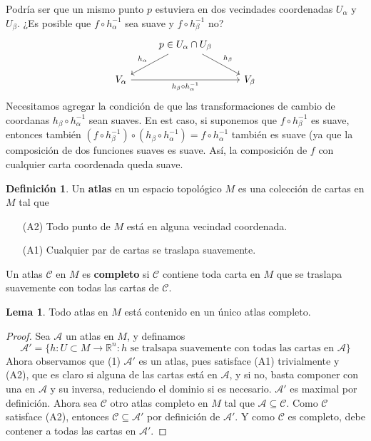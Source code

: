 \documentclass[spanish]{book}
\theoremstyle{definition}
\newtheorem*{defn}{Definición}
\newtheorem*{lema}{Lema}
\newcommand{\R}{\mathbb{R}}
\begin{document}
Podría ser que un mismo punto $p$ estuviera en dos vecindades coordenadas $U_\alpha$ y $U_\beta$. ¿Es posible que $f\circ h^{-1}_\alpha$ sea suave y $f\circ h_\beta^{-1}$ no?
\[\begin{tikzcd}
	&p\in U_\alpha\cap U_\beta\arrow{dl}[swap]{h_\alpha}\arrow{dr}{h_\beta}\\
	V_\alpha\arrow{rr}[swap]{h_\beta\circ h_\alpha^{-1}}&&V_\beta
\end{tikzcd}\]
Necesitamos agregar la condición de que las transformaciones de cambio de coordanas $h_\beta\circ h_\alpha^{-1}$ sean suaves. En est caso, si suponemos que $f\circ h_\beta^{-1}$ es suave, entonces también $(f\circ h_\beta^{-1})\circ(h_\beta\circ h_\alpha^{-1})=f\circ h_\alpha^{-1}$ también es suave (ya que la composición de dos funciones suaves es suave. Así, la composición de $f$ con cualquier carta coordenada queda suave.
\begin{defn}
	Un \textbf{atlas} en un espacio topológico $M$ es una colección de cartas en $M$ tal que
	\begin{enumerate}
		\item[(A2)] Todo punto de $M$ está en alguna vecindad coordenada.
		\item[(A1)] Cualquier par de cartas se traslapa suavemente.
	\end{enumerate}
	Un atlas $\mathcal C$ en $M$ es \textbf{completo} si $\mathcal{C}$ contiene toda carta en $M$ que se traslapa suavemente con todas las cartas de $\mathcal{C}$.
\end{defn}
\begin{lema}
	Todo atlas en $M$ está contenido en un único atlas completo.
\end{lema}
\begin{proof}
	Sea $\mathcal{A}$ un atlas en $M$, y definamos
	\[\mathcal{A}'=\{h:U\subset M\to\R^n:h\text{ se tralsapa suavemente con todas las cartas en }\mathcal{A}\}\]
	Ahora observamos que (1) $\mathcal{A}'$ es un atlas, pues satisface (A1) trivialmente y (A2), que es claro si alguna de las cartas está en $\mathcal{A}$, y si no, basta componer con una en $\mathcal{A}$ y su inversa, reduciendo el dominio si es necesario. $\mathcal{A}'$ es maximal por definición. Ahora sea $\mathcal{C}$ otro atlas completo en $M$ tal que $\mathcal{A}\subseteq\mathcal{C}$. Como $\mathcal{C}$ satisface (A2), entonces $\mathcal{C}\subseteq\mathcal{A}'$ por definición de $\mathcal{A}'$. Y como $\mathcal{C}$ es completo, debe contener a todas las cartas en $\mathcal{A}'$.
	
\end{proof}
\end{document}
